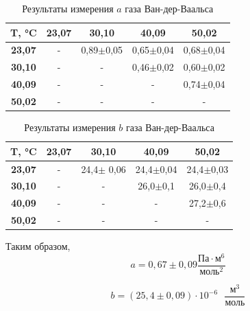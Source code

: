 \documentclass[12pt,a4paper]{article}
\begin{document}
\begin{table}[h!]
\centering
\begin{tabular}{|c|c|c|c|c|}
\hline
\textbf{T, °C} & \textbf{23,07} & \textbf{30,10} & \textbf{40,09} & \textbf{50,02} \\ \hline
\textbf{23,07} & -              & 0,89$\pm$0,05     & 0,65$\pm$0,04     & 0,68$\pm$0,04     \\ \hline
\textbf{30,10} & -              & -              & 0,46$\pm$0,02     & 0,60$\pm$0,02     \\ \hline
\textbf{40,09} & -              & -              & -              & 0,74$\pm$0,04     \\ \hline
\textbf{50,02} & -              & -              & -              & -              \\ \hline
\end{tabular}
	\caption{Результаты измерения $a$ газа Ван-дер-Ваальса}
\end{table}

\begin{table}[h!]
\centering
\begin{tabular}{|c|c|c|c|c|}
\hline
\textbf{T, °C} & \textbf{23,07} & \textbf{30,10} & \textbf{40,09} & \textbf{50,02} \\ \hline
\textbf{23,07} & -              & 24,4$\pm$ 0,06         & 24,4$\pm$0,04          & 24,4$\pm$0,03          \\ \hline
\textbf{30,10} & -              & -              & 26,0$\pm$0,1          & 26,0$\pm$0,4          \\ \hline
\textbf{40,09} & -              & -              & -              & 27,2$\pm$0,6          \\ \hline
\textbf{50,02} & -              & -              & -              & -              \\ \hline
\end{tabular}
	\caption{Результаты измерения $b$ газа Ван-дер-Ваальса}

\end{table}

Таким образом,
\begin{equation*}
    a = 0,67 \pm 0,09 \frac{\text{Па}\cdot\text{м}^6}{\text{моль}^2}
\end{equation*}

\begin{equation*}
    b = (25,4 \pm 0,09) \cdot 10^{-6} \text{ }\frac{\text{м}^3}{\text{моль}}
\end{equation*}
\end{document}

